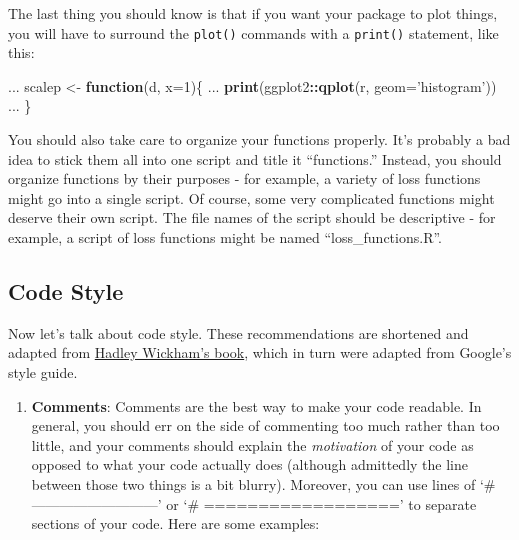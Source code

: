 \documentclass[]{book}
\newenvironment{Shaded}{\begin{snugshade}}{\end{snugshade}}
\newcommand{\KeywordTok}[1]{\textcolor[rgb]{0.13,0.29,0.53}{\textbf{#1}}}
\newcommand{\DataTypeTok}[1]{\textcolor[rgb]{0.13,0.29,0.53}{#1}}
\newcommand{\DecValTok}[1]{\textcolor[rgb]{0.00,0.00,0.81}{#1}}
\newcommand{\StringTok}[1]{\textcolor[rgb]{0.31,0.60,0.02}{#1}}
\newcommand{\ControlFlowTok}[1]{\textcolor[rgb]{0.13,0.29,0.53}{\textbf{#1}}}
\newcommand{\OperatorTok}[1]{\textcolor[rgb]{0.81,0.36,0.00}{\textbf{#1}}}
\newcommand{\NormalTok}[1]{#1}
\providecommand{\tightlist}{%
  \setlength{\itemsep}{0pt}\setlength{\parskip}{0pt}}
\begin{document}
The last thing you should know is that if you want your package to plot
things, you will have to surround the \texttt{plot()} commands with a
\texttt{print()} statement, like this:

\begin{Shaded}
\begin{Highlighting}[]
\NormalTok{ ...}
\NormalTok{scalep <-}\StringTok{ }\ControlFlowTok{function}\NormalTok{(d, }\DataTypeTok{x=}\DecValTok{1}\NormalTok{)\{}
\NormalTok{ ...}
  \KeywordTok{print}\NormalTok{(ggplot2}\OperatorTok{::}\KeywordTok{qplot}\NormalTok{(r, }\DataTypeTok{geom=}\StringTok{'histogram'}\NormalTok{))}
\NormalTok{ ...}
\NormalTok{\}}
\end{Highlighting}
\end{Shaded}

You should also take care to organize your functions properly. It's
probably a bad idea to stick them all into one script and title it
``functions.'' Instead, you should organize functions by their purposes
- for example, a variety of loss functions might go into a single
script. Of course, some very complicated functions might deserve their
own script. The file names of the script should be descriptive - for
example, a script of loss functions might be named
``loss\_functions.R''.

\subsection{Code Style}\label{code-style}

Now let's talk about code style. These recommendations are shortened and
adapted from \href{http://r-pkgs.had.co.nz/r.html}{Hadley Wickham's
book}, which in turn were adapted from Google's style guide.

\begin{enumerate}
\def\labelenumi{\arabic{enumi}.}
\tightlist
\item
  \textbf{Comments}: Comments are the best way to make your code
  readable. In general, you should err on the side of commenting too
  much rather than too little, and your comments should explain the
  \emph{motivation} of your code as opposed to what your code actually
  does (although admittedly the line between those two things is a bit
  blurry). Moreover, you can use lines of `\#
  ---------------------------' or `\# ==================' to separate
  sections of your code. Here are some examples:
\end{enumerate}
\end{document}
